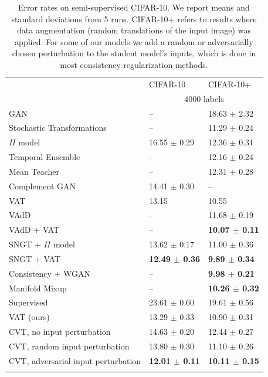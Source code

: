 \documentclass[11pt,a4paper]{article}
\newcommand\Tstrut{\rule{0pt}{2.6ex}}         %
\newcommand\Bstrut{\rule[-1.0ex]{0pt}{0pt}}   %
\newcommand{\thinline}{\Xhline{1.0\arrayrulewidth}}
\newcommand{\thickline}{\Xhline{2.5\arrayrulewidth}}
\newcommand{\tsep}	{\Bstrut \\ \thinline}
\newcommand{\ttop}{\thickline}
\newcommand{\tbottom}{\Bstrut \\ \thickline}
\begin{document}
\addtolength{\tabcolsep}{15pt}
\begin{table}[h!]
\begin{tabular}{l l l}
\ttop
\multirow{2}{*}{Method} & CIFAR-10 & CIFAR-10+\Tstrut \\
             &  \multicolumn{2}{c}{$4000$ labels}\tsep
 GAN \cite{salimans2016improved} & -- & 18.63 $\pm$ 2.32\Tstrut\\
 Stochastic Transformations \cite{sajjadi2016regularization}  & -- & 11.29 $\pm$ 0.24\\
 $\Pi$ model \cite{laine2016temporal}  & 16.55 $\pm$ 0.29 & 12.36 $\pm$ 0.31 \\
 Temporal Ensemble \cite{laine2016temporal}  & -- & 12.16 $\pm$ 0.24 \\
 Mean Teacher \cite{tarvainen2017weight} & -- & 12.31 $\pm$ 0.28 \\
 Complement GAN \cite{dai2017good}  & 14.41 $\pm$ 0.30 & -- \\
 VAT \cite{miyato2017virtual} & 13.15 & 10.55 \\
 VAdD \cite{park2017adversarial} & -- & 11.68 $\pm$ 0.19 \\
 VAdD + VAT \cite{park2017adversarial}  & -- & \textbf{10.07 $\pm$ 0.11} \\
 SNGT + $\Pi$ model \cite{luong17} & 13.62 $\pm$ 0.17 & 11.00 $\pm$ 0.36 \\
 SNGT + VAT \cite{luong17}  & \textbf{12.49 $\pm$ 0.36} & \textbf{9.89 $\pm$ 0.34} \\
 Consistency + WGAN \cite{wei2018improving} & -- & \textbf{9.98 $\pm$ 0.21} \\
 Manifold Mixup \cite{verma2018manifold} & -- &  \textbf{10.26 $\pm$ 0.32} 
 \tsep
 Supervised & 23.61 $\pm$ 0.60 & 19.61 $\pm$ 0.56 \Tstrut\\
 VAT (ours)  & 13.29 $\pm$ 0.33 & 10.90 $\pm$ 0.31\\
 CVT, no input perturbation  & 14.63 $\pm$ 0.20 & 12.44 $\pm$ 0.27 \\
 CVT, random input perturbation & 13.80 $\pm$ 0.30 & 11.10 $\pm$ 0.26 \\
 CVT, adversarial input perturbation  & \textbf{12.01 $\pm$ 0.11} & \textbf{10.11 $\pm$ 0.15}\tbottom
\end{tabular}
\vspace{1mm}
\caption{
		Error rates on semi-supervised CIFAR-10. We report means and standard deviations from 5 runs.
		CIFAR-10+ refers to results where data augmentation (random translations of the input image) was applied. For some of our models we add a random or adversarially chosen perturbation to the student model's inputs, which is done in most consistency regularization methods.
}
\label{tab:vision}
\end{table}
\addtolength{\tabcolsep}{-15pt}
\end{document}
